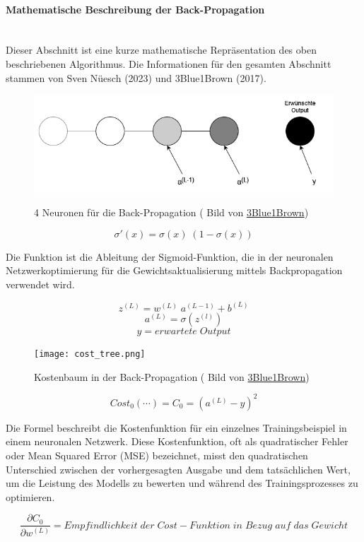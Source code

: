 \paragraph{Mathematische Beschreibung der Back-Propagation}
\label{sec:back_propagation_math}
\mbox{}\\\noindent Dieser Abschnitt ist eine kurze mathematische Repräsentation des oben beschriebenen Algorithmus. Die Informationen für den gesamten Abschnitt stammen von Sven Nüesch (2023) und 3Blue1Brown (2017).

\begin{figure}[H]
	\centering
		\includegraphics[width=0.75\linewidth]{images/4neurons.png}
	\label{fig:4neurons}
	\caption{4 Neuronen für die Back-Propagation ( Bild von \href{https://www.youtube.com/watch?v=tIeHLnjs5U8}{3Blue1Brown})}
\end{figure}

\[\sigma '(x) = \sigma(x)\; (1-\sigma(x))\]

\noindent Die Funktion ist die Ableitung der Sigmoid-Funktion, die in der neuronalen Netzwerkoptimierung für die Gewichtsaktualisierung mittels Backpropagation verwendet wird.

\[z^{(L)} = w^{(L)}\; a^{(L-1)}+b^{(L)}\]
\[a^{(L)} = \sigma(z^{(l)})\]
\[y = erwartete\; Output\]


\begin{figure}[H]
	\centering
		\texttt{[image: cost\_tree.png]}
	\label{fig:cost_tree}
	\caption{Kostenbaum in der Back-Propagation ( Bild von \href{https://www.youtube.com/watch?v=tIeHLnjs5U8}{3Blue1Brown})}
\end{figure}


\[Cost_0(\cdots) = C_0 = (a^{(L)}-y)^2 \]

\noindent Die Formel beschreibt die Kostenfunktion für ein einzelnes Trainingsbeispiel in einem neuronalen Netzwerk. Diese Kostenfunktion, oft als quadratischer Fehler oder Mean Squared Error (MSE) bezeichnet, misst den quadratischen Unterschied zwischen der vorhergesagten Ausgabe und dem tatsächlichen Wert, um die Leistung des Modells zu bewerten und während des Trainingsprozesses zu optimieren.

\[\frac{\partial C_0}{\partial w^{(L)}} = Empfindlichkeit\; der\; Cost-Funktion\; in\; Bezug\; auf\; das\; Gewicht\]


